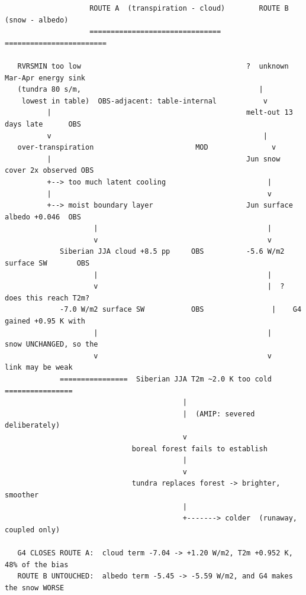 \documentclass[10pt]{article}
\begin{document}
\begin{footnotesize}
\begin{verbatim}
                    ROUTE A  (transpiration - cloud)        ROUTE B  (snow - albedo)
                    ===============================         ========================

   RVRSMIN too low                                       ?  unknown Mar-Apr energy sink
   (tundra 80 s/m,                                          |
    lowest in table)  OBS-adjacent: table-internal           v
          |                                              melt-out 13 days late      OBS
          v                                                  |
   over-transpiration                        MOD               v
          |                                              Jun snow cover 2x observed OBS
          +--> too much latent cooling                        |
          |                                                   v
          +--> moist boundary layer                      Jun surface albedo +0.046  OBS
                     |                                        |
                     v                                        v
             Siberian JJA cloud +8.5 pp     OBS          -5.6 W/m2 surface SW       OBS
                     |                                        |
                     v                                        |  ? does this reach T2m?
             -7.0 W/m2 surface SW           OBS                |    G4 gained +0.95 K with
                     |                                        |    snow UNCHANGED, so the
                     v                                        v    link may be weak
             ================  Siberian JJA T2m ~2.0 K too cold  ================
                                          |
                                          |  (AMIP: severed deliberately)
                                          v
                              boreal forest fails to establish
                                          |
                                          v
                              tundra replaces forest -> brighter, smoother
                                          |
                                          +-------> colder  (runaway, coupled only)

   G4 CLOSES ROUTE A:  cloud term -7.04 -> +1.20 W/m2, T2m +0.952 K, 48% of the bias
   ROUTE B UNTOUCHED:  albedo term -5.45 -> -5.59 W/m2, and G4 makes the snow WORSE
\end{verbatim}
\end{footnotesize}
\end{document}
